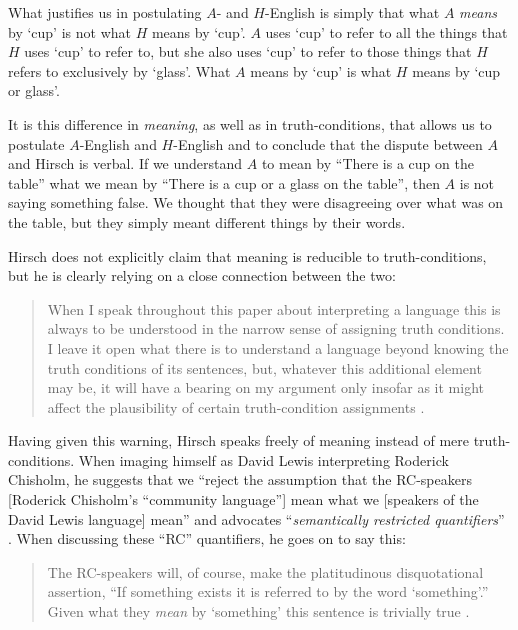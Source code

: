 \documentclass[12pt,twoside]{reedfancy}
\begin{document}
\begin{spacing}{1.25}
What justifies us in postulating $A$- and $H$-English is simply that
what $A$ {\em means} by `cup' is not what $H$ means by `cup'.  $A$
uses `cup' to refer to all the things that $H$ uses `cup' to refer to,
but she also uses `cup' to refer to those things that $H$ refers to
exclusively by `glass'.  What $A$ means by `cup' is what $H$ means by
`cup or glass'.

It is this difference in {\em meaning}, as well as in
truth-conditions, that allows us to postulate $A$-English and
$H$-English and to conclude that the dispute between $A$ and Hirsch is
verbal. If we understand $A$ to mean by ``There is a cup on the
table'' what we mean by ``There is a cup or a glass on the table'',
then $A$ is not saying something false.  We thought that they were
disagreeing over what was on the table, but they simply meant
different things by their words.

Hirsch does not explicitly claim that meaning is reducible to
truth-conditions, but he is clearly relying on a close connection
between the two:

\begin{quote}
When I speak throughout this paper about interpreting a language this
is always to be understood in the narrow sense of assigning truth
conditions.  I leave it open what there is to understand a language
beyond knowing the truth conditions of its sentences, but, whatever
this additional element may be, it will have a bearing on my argument
only insofar as it might affect the plausibility of certain
truth-condition assignments \citeyearpar[72]{hirsch2005}.
\end{quote}

Having given this warning, Hirsch speaks freely of meaning instead of
mere truth-conditions.  When imaging himself as David Lewis
interpreting Roderick Chisholm, he suggests that we ``reject the
assumption that the RC-speakers [Roderick Chisholm's ``community
  language''] mean what we [speakers of the David Lewis language]
mean'' \citeyearpar[76]{hirsch2005} and advocates ``{\em semantically
  restricted quantifiers}'' \citeyearpar[76, his
  emphasis]{hirsch2005}.  When discussing these ``RC'' quantifiers, he
goes on to say this:

\begin{quote}
The RC-speakers will, of course, make the platitudinous disquotational
assertion, ``If something exists it is referred to by the word
`something'.''  Given what they {\em mean} by `something' this
sentence is trivially true \citeyearpar[77, my emphasis]{hirsch2005}.
\end{quote}


\end{spacing}
\end{document}
